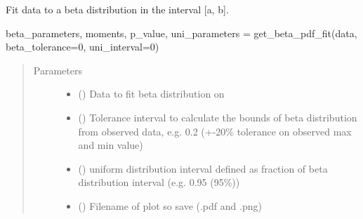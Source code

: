 \documentclass[letterpaper,10pt,english,openany,oneside]{sphinxmanual}
\begin{document}

\begin{fulllineitems}
\label{\detokenize{pygpc:pygpc.misc.get_beta_pdf_fit}}
Fit data to a beta distribution in the interval {[}a, b{]}.

beta\_parameters, moments, p\_value, uni\_parameters = get\_beta\_pdf\_fit(data, beta\_tolerance=0, uni\_interval=0)
\begin{quote}\begin{description}
\item[{Parameters}] \leavevmode\begin{itemize}
\item {} 
 () \textendash{} Data to fit beta distribution on

\item {} 
 (\sphinxstyleliteralemphasis{\sphinxupquote{, }}\sphinxstyleliteralemphasis{\sphinxupquote{, }}) \textendash{} Tolerance interval to calculate the bounds of beta distribution
from observed data, e.g. 0.2 (+-20\% tolerance on observed max and min value)

\item {} 
 (\sphinxstyleliteralemphasis{\sphinxupquote{, }}\sphinxstyleliteralemphasis{\sphinxupquote{, }}) \textendash{} uniform distribution interval defined as fraction of beta distribution interval (e.g. 0.95 (95\%))

\item {} 
 () \textendash{} Filename of plot so save (.pdf and .png)

\end{itemize}


\end{description}
\end{quote}
\end{fulllineitems}
\end{document}
